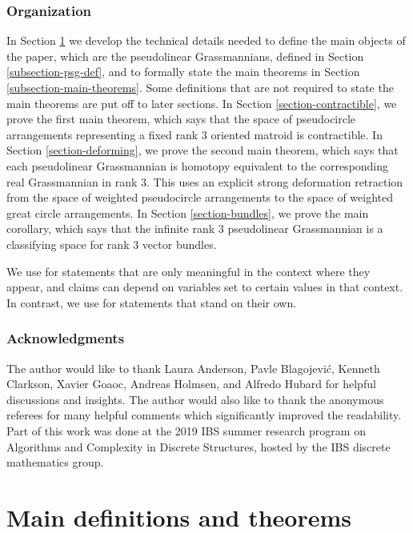 \subsubsection*{Organization}

In Section \ref{section-def} we develop the technical details needed to define the main objects of the paper, which are the pseudolinear Grassmannians, defined in Section \ref{subsection-psg-def}, and to formally state the main theorems in Section \ref{subsection-main-theorems}.
Some definitions that are not required to state the main theorems are put off to later sections.
In Section \ref{section-contractible}, we prove the first main theorem, which says that the space of pseudocircle arrangements representing a fixed rank $3$ oriented matroid is contractible.
In Section \ref{section-deforming}, we prove the second main theorem, which says that each pseudolinear Grassmannian is homotopy equivalent to the corresponding real Grassmannian in rank 3.
This uses an explicit strong deformation retraction from the space of weighted pseudocircle arrangements to the space of weighted great circle arrangements.
In Section \ref{section-bundles}, we prove the main corollary, which says that the infinite rank $3$ pseudolinear Grassmannian is a classifying space for rank $3$ vector bundles.

We use  for statements that are only meaningful in the context where they appear, and claims can depend on variables set to certain values in that context. In contrast, we use  for statements that stand on their own.

\subsubsection*{Acknowledgments}

The author would like to thank
Laura Anderson,
Pavle Blagojević,
Kenneth Clarkson,
Xavier Goaoc,
Andreas Holmsen,
and Alfredo Hubard
for helpful discussions and insights.
The author would also like to thank the anonymous referees for many helpful comments which significantly improved the readability.
Part of this work was done at the 2019 IBS summer research program on Algorithms and Complexity in Discrete Structures, hosted by the IBS discrete mathematics group.

\section{Main definitions and theorems}\label{section-def}

